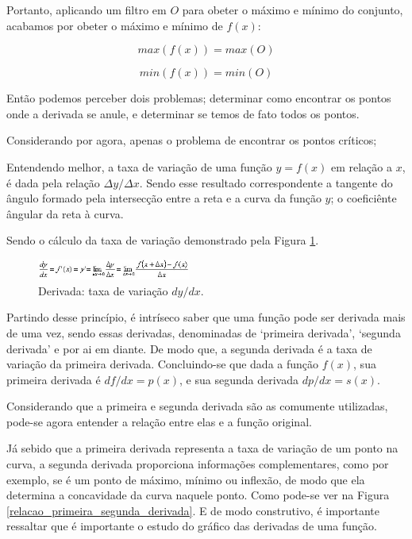 Portanto, aplicando um filtro em $O$ para obeter o máximo e mínimo do conjunto,
acabamos por obeter o máximo e mínimo de \(f(x)\):


\begin{equation}
    max(f(x)) = max(O)
\end{equation}

\begin{equation}
    min(f(x)) = min(O)
\end{equation}


Então podemos perceber dois problemas; determinar como encontrar os pontos onde
a derivada se anule, e determinar se temos de fato todos os pontos.

Considerando por agora, apenas o problema de encontrar os pontos críticos;

Entendendo melhor, a taxa de variação de uma função \(y=f(x)\) em relação a
\(x\), é dada pela relação \(\Delta y / \Delta x\). Sendo esse resultado
correspondente a tangente do ângulo formado pela intersecção entre a reta e a
curva da função \(y\); o coeficiênte ângular da reta à curva.

Sendo o cálculo da taxa de variação demonstrado pela Figura
\ref{derivada_padrao}.

\begin{figure}[h]
    \includegraphics[width=0.45\textwidth]
        {src/derivada_padrao.jpg}
    \centering
    \caption{Derivada: taxa de variação \(dy/dx\).}
    \label{derivada_padrao}
\end{figure}

Partindo desse princípio, é intríseco saber que uma função pode ser derivada
mais de uma vez, sendo essas derivadas, denominadas de `primeira derivada',
`segunda derivada' e por ai em diante. De modo que, a segunda derivada é
a taxa de variação da primeira derivada. Concluindo-se que dada a função
\(f(x)\), sua primeira derivada é \(df/dx = p(x)\), e sua segunda derivada
\(dp/dx = s(x)\).

Considerando que a primeira e segunda derivada são as comumente utilizadas,
pode-se agora entender a relação entre elas e a função original.

Já sebido que a primeira derivada representa a taxa de variação de um ponto na
curva, a segunda derivada proporciona informações complementares, como por
exemplo, se é um ponto de máximo, mínimo ou inflexão, de modo que ela determina
a concavidade da curva naquele ponto. Como pode-se ver na Figura
\ref{relacao_primeira_segunda_derivada}. E de modo construtivo, é importante
ressaltar que é importante o estudo do gráfico das derivadas de uma função.

